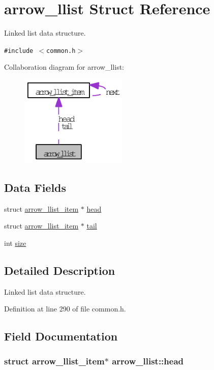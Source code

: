 \hypertarget{structarrow__llist}{
\section{arrow\_\-llist Struct Reference}
\label{structarrow__llist}
}
Linked list data structure.  


{\tt \#include $<$common.h$>$}

Collaboration diagram for arrow\_\-llist:\nopagebreak
\begin{figure}[H]
\begin{center}
\leavevmode
\includegraphics[width=144pt]{structarrow__llist__coll__graph}
\end{center}
\end{figure}
\subsection*{Data Fields}
\begin{CompactItemize}
\item 
struct \hyperlink{structarrow__llist__item}{arrow\_\-llist\_\-item} $\ast$ \hyperlink{structarrow__llist_cd27eb82097c41cb5e7ba68560073904}{head}
\item 
struct \hyperlink{structarrow__llist__item}{arrow\_\-llist\_\-item} $\ast$ \hyperlink{structarrow__llist_17aad561a27cd835fef598e8ffd135c8}{tail}
\item 
int \hyperlink{structarrow__llist_89bdc72883d1d24717445c8087b6b0dc}{size}
\end{CompactItemize}


\subsection{Detailed Description}
Linked list data structure. 

Definition at line 290 of file common.h.

\subsection{Field Documentation}
\hypertarget{structarrow__llist_cd27eb82097c41cb5e7ba68560073904}{
\subsubsection[{head}]{\setlength{\rightskip}{0pt plus 5cm}struct {\bf arrow\_\-llist\_\-item}$\ast$ {\bf arrow\_\-llist::head}}}
\label{structarrow__llist_cd27eb82097c41cb5e7ba68560073904}


